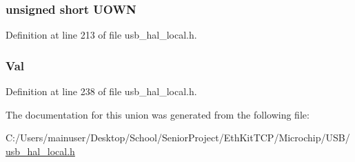 \subsubsection[{U\+O\+W\+N}]{\setlength{\rightskip}{0pt plus 5cm}unsigned short U\+O\+W\+N}\label{union___b_d_t___s_e_t_u_p_a5580d5dc191e4f973fcfa5feaa34369f}


Definition at line 213 of file usb\+\_\+hal\+\_\+local.\+h.

\hypertarget{union___b_d_t___s_e_t_u_p_aa498550e7f87da9a38dc71609652e6bd}{}
\subsubsection[{Val}]{ Val}\label{union___b_d_t___s_e_t_u_p_aa498550e7f87da9a38dc71609652e6bd}


Definition at line 238 of file usb\+\_\+hal\+\_\+local.\+h.



The documentation for this union was generated from the following file\+:\begin{DoxyCompactItemize}
\item 
C\+:/\+Users/mainuser/\+Desktop/\+School/\+Senior\+Project/\+Eth\+Kit\+T\+C\+P/\+Microchip/\+U\+S\+B/\hyperlink{usb__hal__local_8h}{usb\+\_\+hal\+\_\+local.\+h}\end{DoxyCompactItemize}
